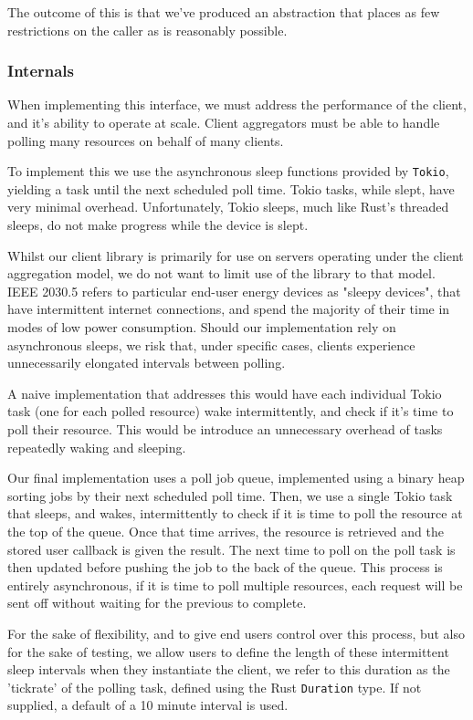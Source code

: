 The outcome of this is that we've produced an abstraction that places as few restrictions on the caller as is reasonably possible.

\subsubsection{Internals}
When implementing this interface, we must address the performance of the client, and it's ability to operate at scale. Client aggregators must be able to handle polling many resources on behalf of many clients.

To implement this we use the asynchronous sleep functions provided by \texttt{Tokio}, yielding a  task until the next scheduled poll time. Tokio tasks, while slept, have very minimal overhead. Unfortunately, Tokio sleeps, much like Rust's threaded sleeps, do not make progress while the device is slept. 

Whilst our client library is primarily for use on servers operating under the client aggregation model, we do not want to limit use of the library to that model. IEEE 2030.5 refers to particular end-user energy devices as "sleepy devices", that have intermittent internet connections, and spend the majority of their time in modes of low power consumption. Should our implementation rely on asynchronous sleeps, we risk that, under specific cases, clients experience unnecessarily elongated intervals between polling.

A naive implementation that addresses this would have each individual Tokio task (one for each polled resource) wake intermittently, and check if it's time to poll their resource. This would be introduce an unnecessary overhead of tasks repeatedly waking and sleeping.

Our final implementation uses a poll job queue, implemented using a binary heap sorting jobs by their next scheduled poll time. Then, we use a single Tokio task that sleeps, and wakes, intermittently to check if it is time to poll the resource at the top of the queue. Once that time arrives, the resource is retrieved and the stored user callback is given the result. The next time to poll on the poll task is then updated before pushing the job to the back of the queue. This process is entirely asynchronous, if it is time to poll multiple resources, each request will be sent off without waiting for the previous to complete. 

For the sake of flexibility, and to give end users control over this process, but also for the sake of testing, we allow users to define the length of these intermittent sleep intervals when they instantiate the client, we refer to this duration as the 'tickrate' of the polling task, defined using the Rust \texttt{Duration} type. If not supplied, a default of a 10 minute interval is used.

